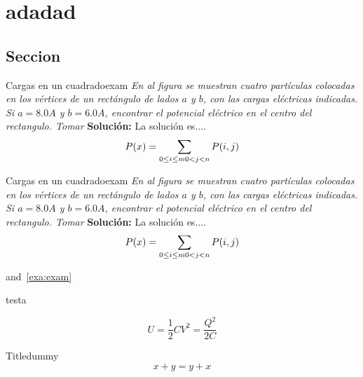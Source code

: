\documentclass{report}
\newcounter{test}
\begin{document}
\chapter{adadad}
\section{Seccion}
\begin{Example}{Cargas en un cuadrado}{exam}
 \emph{En al figura se muestran cuatro partículas colocadas en los vértices de un rectángulo de lados $a$ y $b$, con las cargas eléctricas indicadas. Si $a=8.0 A$ y $b=6.0 A$, encontrar el potencial el\'ectrico en el centro del rectangulo. Tomar}
\newline
{\bf{\large{Soluci\'on:}}}
\newline
La soluci\'on es....
\begin{equation}
P(x)=\sum_{0\le i\le m\\0<j<n}P(i, j)
\end{equation}

\lipsum[1-6]
\end{Example}
\begin{Example}{Cargas en un cuadrado}{exam}
 \emph{En al figura se muestran cuatro partículas colocadas en los vértices de un rectángulo de lados $a$ y $b$, con las cargas eléctricas indicadas. Si $a=8.0 A$ y $b=6.0 A$, encontrar el potencial el\'ectrico en el centro del rectangulo. Tomar}
\newline
{\bf{\large{Soluci\'on:}}}
\newline
La soluci\'on es....
\begin{equation}
P(x)=\sum_{0\le i\le m\\0<j<n}P(i, j)
\end{equation}

\lipsum[1-6]
\end{Example}
\noindent
{} and~\cref{exa:exam}

\begin{test}{testa}
\lipsum[1-6]
\end{test}
\begin{tcolorbox}
[enhanced,breakable,pad at break=0mm,colback=green!5!,colframe=green!35!black,title=\large\bf{Trabajo}]
\begin{equation}
U=\frac{1}{2}CV^{2}=\frac{Q^{2}}{2C}
\end{equation}
\end{tcolorbox}

\begin{corollary}{Title}{dummy}
    \[
      x+y=y+x
    \]
  \end{corollary}
  
\end{document}
